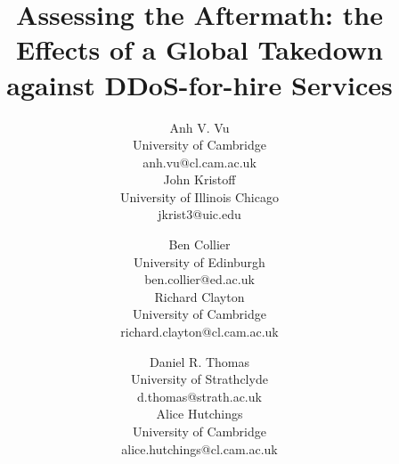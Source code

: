 \documentclass[letterpaper,twocolumn,10pt]{article}
\begin{document}
\setlength{\headheight}{15pt} 
\setlength{\headsep}{24pt}  
\addtolength{\topmargin}{-14.5mm}

\title{\Large \bf Assessing the Aftermath: the Effects of a Global Takedown\\against DDoS-for-hire Services}
\author{
    {\rm Anh V. Vu}\\University of Cambridge\\anh.vu@cl.cam.ac.uk\vspace{3mm}\\
    {\rm John Kristoff}\\University of Illinois Chicago\\jkrist3@uic.edu\vspace{4mm}
    \and
    {\rm Ben Collier}\\University of Edinburgh\\ben.collier@ed.ac.uk\vspace{3mm}\\
    {\rm Richard Clayton}\\University of Cambridge\\richard.clayton@cl.cam.ac.uk\vspace{4mm}
    \and
    {\rm Daniel R. Thomas}\\University of Strathclyde\\d.thomas@strath.ac.uk\vspace{3mm}\\
    {\rm Alice Hutchings}\\University of Cambridge\\alice.hutchings@cl.cam.ac.uk\vspace{4mm}
}
\maketitle
\end{document}
